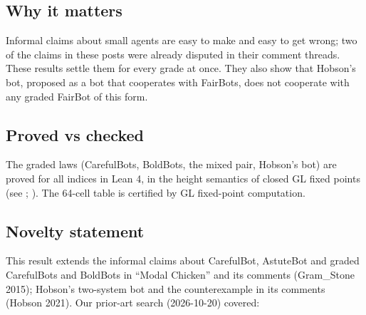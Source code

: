 \documentclass{article}
\begin{document}
\subsection*{Why it matters}

Informal claims about small agents are easy to make and easy to get wrong; two of the claims in
these posts were already disputed in their comment threads. These results settle them for every
grade at once. They also show that Hobson's bot, proposed as a bot that cooperates with FairBots,
does not cooperate with any graded FairBot of this form.

\subsection*{Proved vs checked}

The graded laws (CarefulBots, BoldBots, the mixed pair, Hobson's bot) are proved for all indices in
Lean 4, in the height semantics of closed GL fixed points (see \cite{boolos1993logic};
\cite{solovay1976provability}). The 64-cell table is certified by GL fixed-point computation.

\subsection*{Novelty statement}

This result extends the informal claims about CarefulBot, AstuteBot and graded CarefulBots and BoldBots in ``Modal Chicken'' and its comments (Gram\_Stone 2015); Hobson's two-system bot and the counterexample in its comments (Hobson 2021). Our prior-art search (2026-10-20) covered:
\end{document}
